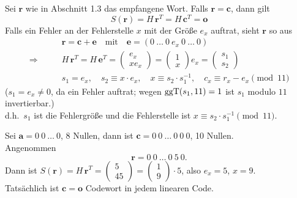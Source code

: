 Sei $\mathbf{r}$ wie in Abschnitt 1.3 das empfangene Wort. Falls $\mathbf{r} = \mathbf{c}$, dann gilt
\[
  S(\mathbf{r}) = H\,\mathbf{r}^T = H\,\mathbf{c}^T = \mathbf{o}
\]
Falls ein Fehler an der Fehlerstelle $x$ mit der Größe $e_x$ auftrat, sieht $\mathbf{r}$ so aus
\begin{align*}
  & \mathbf{r} = \mathbf{c} + \mathbf{e} \quad\text{mit}\quad \mathbf{e} = (0\ \dots\ 0\ e_x\ 0\ \dots\ 0)\\
  \Rightarrow\qquad & H\,\mathbf{r}^T = H\,\mathbf{e}^T = \begin{pmatrix} e_x\\ x e_x \end{pmatrix}
    = \begin{pmatrix} 1\\ x \end{pmatrix} e_x = \begin{pmatrix} s_1\\ s_2 \end{pmatrix}\\
  & s_1 = e_x,\quad s_2 \equiv x \cdot e_x,\quad x \equiv s_2 \cdot s_1^{-1},\quad c_x \equiv r_x - e_x \pmod{11}
\end{align*}
($s_1 = e_x \neq 0$, da ein Fehler auftrat; wegen $\operatorname{ggT}(s_1, 11) = 1$ ist $s_1$ modulo $11$ invertierbar.)\\
d.h.\ $s_1$ ist die Fehlergröße und die Fehlerstelle ist $x \equiv s_2 \cdot s_1^{-1} \pmod{11}$.

\begin{beispiel}
Sei $\mathbf{a} = 0\ 0\ \dots\ 0$, 8 Nullen, dann ist $\mathbf{c} = 0\ 0\ \dots\ 0\ 0\ 0$, 10 Nullen.\\
Angenommen
\[ \mathbf{r} = 0\ 0\ \dots\ 0\ 5\ 0. \]
Dann ist $S(\mathbf{r}) = H\,\mathbf{r}^T = \begin{pmatrix} 5\\ 45 \end{pmatrix} = \begin{pmatrix} 1\\ 9 \end{pmatrix} \cdot 5$, also $e_x = 5$, $x = 9$.\\
Tatsächlich ist $\mathbf{c} = \mathbf{o}$ Codewort in jedem linearen Code.
\end{beispiel}

